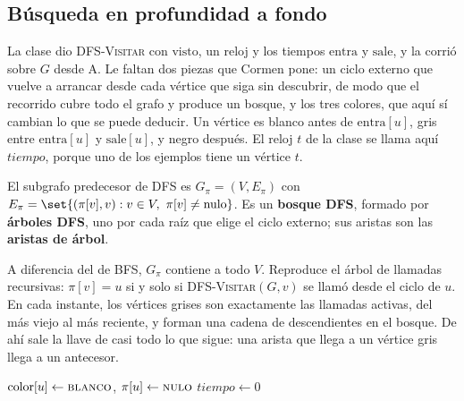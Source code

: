 \documentclass[11pt,letterpaper]{article}
\begin{document}

\subsection*{Búsqueda en profundidad a fondo}

La clase dio \textsc{DFS-Visitar} con $\text{visto}$, un reloj y los
tiempos $\text{entra}$ y $\text{sale}$, y la corrió sobre $G$ desde A.
Le faltan dos piezas que Cormen pone: un ciclo externo que vuelve a
arrancar desde cada vértice que siga sin descubrir, de modo que el
recorrido cubre todo el grafo y produce un bosque, y los tres colores,
que aquí sí cambian lo que se puede deducir. Un vértice es blanco
antes de $\text{entra}[u]$, gris entre $\text{entra}[u]$ y
$\text{sale}[u]$, y negro después. El reloj $t$ de la clase se llama
aquí $\mathit{tiempo}$, porque uno de los ejemplos tiene un vértice
$t$.

\begin{definicion}
  El subgrafo predecesor de DFS es $G_\pi = (V, E_\pi)$ con
  $E_\pi = \set{(\pi[v], v) : v \in V,\ \pi[v] \neq \text{nulo}}$.
  Es un \textbf{bosque DFS}, formado por \textbf{árboles DFS}, uno
  por cada raíz que elige el ciclo externo; sus aristas son las
  \textbf{aristas de árbol}.
\end{definicion}

A diferencia del de BFS, $G_\pi$ contiene a todo $V$. Reproduce el
árbol de llamadas recursivas: $\pi[v] = u$ si y solo si
\textsc{DFS-Visitar}$(G, v)$ se llamó desde el ciclo de $u$. En cada
instante, los vértices grises son exactamente las llamadas activas,
del más viejo al más reciente, y forman una cadena de descendientes en
el bosque. De ahí sale la llave de casi todo lo que sigue: una arista
que llega a un vértice gris llega a un antecesor.

\begin{algorithm}[H]
\caption{\textsc{DFS}$(G)$ con colores y tiempos (Cormen, sección
  22.3)}
\label{alg:dfs-tiempos}
\begin{algorithmic}[1]
    \State $\text{color}[u] \gets \textsc{blanco}$, \quad
           $\pi[u] \gets \textsc{nulo}$
  \EndFor
  \State $\mathit{tiempo} \gets 0$
      \State {}
    \EndIf
  \EndFor
\EndProcedure
\end{algorithmic}
\end{algorithm}
\end{document}
